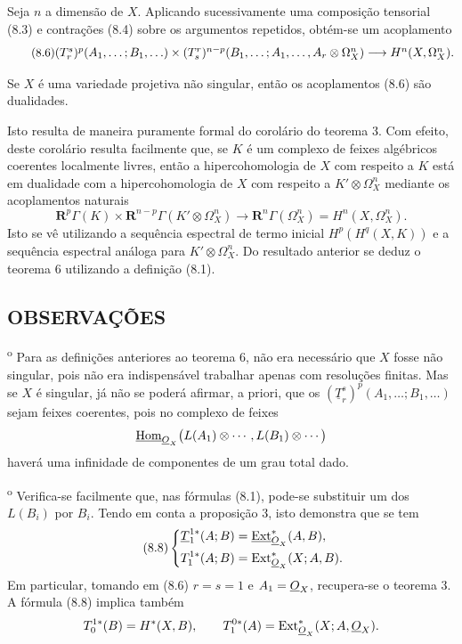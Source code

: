 Seja $n$ a dimensão de $X$. Aplicando sucessivamente uma composição
tensorial (8.3) e contrações (8.4) sobre os argumentos repetidos, obtém-se
um acoplamento
\begin{equation}\tag{8.6}
\resizebox{\textwidth}{!}{$
  (T_{r}^{s})^{p}(A_1,\ldots;B_1,\ldots)
  \times
  (T_{s}^{r})^{n-p}(B_1,\ldots;A_1,\ldots,A_r\otimes\Omega_X^{n})
  \longrightarrow H^{n}(X,\Omega_X^{n}).
$}
\end{equation}

 Se $X$ é uma variedade projetiva não singular, então
os acoplamentos (8.6) são dualidades.

Isto resulta de maneira puramente formal do corolário do teorema 3. Com efeito,
deste corolário resulta facilmente que, se $K$ é um complexo de feixes
algébricos coerentes localmente livres, então a hipercohomologia de $X$ com
respeito a $K$ está em dualidade com a hipercohomologia de $X$ com respeito a
$K'\otimes\Omega_X^{n}$ mediante os acoplamentos naturais
\begin{equation}\tag{8.7}
  \mathbf R^{p}\Gamma(K)
  \times\mathbf R^{n-p}\Gamma(K'\otimes\Omega_X^{n})
  \longrightarrow\mathbf R^{n}\Gamma(\Omega_X^{n})
  =H^{n}(X,\Omega_X^{n}).
\end{equation}
Isto se vê utilizando a sequência espectral de termo inicial
$H^{p}(H^{q}(X,K))$ e a sequência espectral análoga para
$K'\otimes\Omega_X^{n}$. Do resultado anterior se deduz o teorema 6
utilizando a definição (8.1).

\subsection*{OBSERVAÇÕES}

\textsuperscript{o} Para as definições anteriores ao teorema 6,
não era necessário que $X$ fosse não singular, pois não era
indispensável trabalhar apenas com resoluções finitas. Mas se $X$
é singular, já não se poderá afirmar, a priori, que os
$(\underline{T}_{r}^{s})^{p}(A_1,\ldots;B_1,\ldots)$ sejam feixes
coerentes, pois no complexo de feixes
\[
  \underline{\operatorname{Hom}}_{\underline{O}_X}\bigl(L(A_1)\otimes\cdots,L(B_1)\otimes\cdots\bigr)
\]
haverá uma infinidade de componentes de um grau total dado.

\medskip
{}\textsuperscript{o} Verifica-se facilmente que, nas fórmulas
(8.1), pode-se substituir um dos $L(B_i)$ por $B_i$. Tendo em conta a
proposição 3, isto demonstra que se tem
\begin{equation}\tag{8.8}
\left\{
\begin{aligned}
  \underline{T}_{1}^{1*}(A;B)&=\underline{\operatorname{Ext}}_{\underline{O}_X}^{*}(A,B),\\
  T_{1}^{1*}(A;B)&=\operatorname{Ext}_{\underline{O}_X}^{*}(X;A,B).
\end{aligned}
\right.
\end{equation}
Em particular, tomando em (8.6) $r=s=1$ e $A_1=\underline{O}_X$, recupera-se o
teorema 3. A fórmula (8.8) implica também
\[
  T_{0}^{1*}(B)=H^{*}(X,B),
  \qquad
  T_{1}^{0*}(A)=\operatorname{Ext}_{\underline{O}_X}^{*}(X;A,\underline{O}_X).
\]

